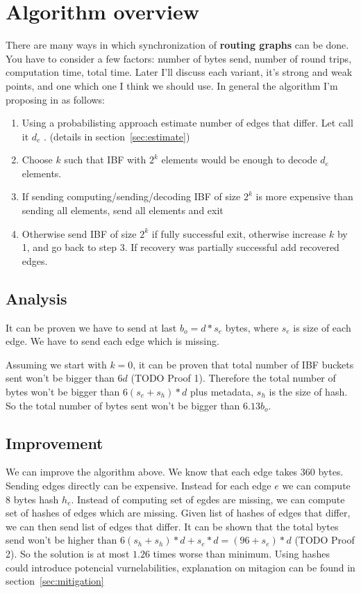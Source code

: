 \documentclass[11pt]{article}
\begin{document}
\section{Algorithm overview}
There are many ways in which synchronization of \textbf{routing graphs} can be done. 
You have to consider a few factors: number of bytes send, number of round trips, computation time, total time.
Later I'll discuss each variant, it's strong and weak points, and one which one I think we should use.
In general the algorithm I'm proposing in as follows:
\begin{enumerate}
  \item Using a probabilisting approach estimate number of edges that differ. Let call it $d_e$ . (details in section~\ref{sec:estimate})
  \item Choose $k$ such that IBF with $2^k$ elements would be enough to decode $d_e$ elements. 
  \item If sending computing/sending/decoding IBF of size $2^k$ is more expensive than sending all elements, send all elements and exit
  \item Otherwise send IBF of size $2^k$ if fully successful exit, otherwise increase $k$ by 1, and go back to step 3.
 If recovery was partially successful add recovered edges.
\end{enumerate}
\subsection{Analysis}
It can be proven we have to send at last $b_o = d*s_e$ bytes, where $s_e$ is size of each edge. We have to send each edge which is missing.

Assuming we start with $k=0$, it can be proven that total number of IBF buckets sent won't be bigger than $6d$  (TODO Proof 1).
Therefore the total number of bytes won't be bigger than $6(s_e+s_h)*d$ plus metadata, $s_h$ is the size of hash.
So the total number of bytes sent won't be bigger than $6.13b_o$.
\subsection{Improvement}
We can improve the algorithm above. We know that each edge takes 360 bytes. Sending edges directly can be expensive. Instead for each edge $e$ we can compute 8 bytes hash $h_e$.
Instead of computing set of egdes are missing, we can compute set of hashes of edges which are missing. Given list of hashes of edges that differ, we can then send list of edges that differ.
It can be shown that the total bytes send won't be higher than $6(s_h+s_h)*d + s_e * d = (96+s_e)*d$ (TODO Proof 2). So the solution is at most $1.26$ times worse than minimum.
Using hashes could introduce potencial vurnelabilities, explanation on mitagion can be found in section~\ref{sec:mitigation}
\end{document}
